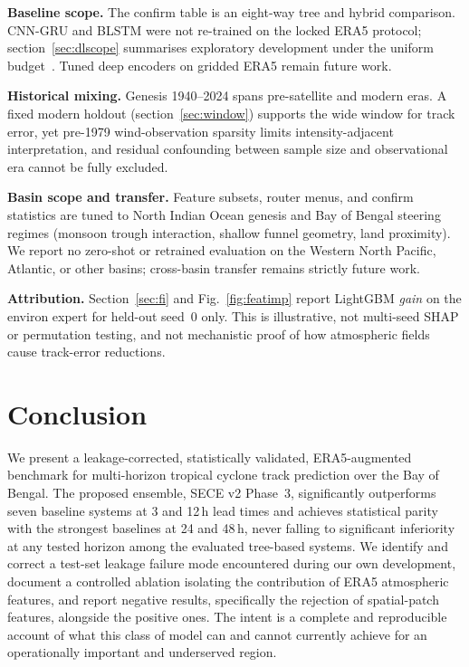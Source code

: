 \documentclass{ametsocv6.1}
\newcommand{\sece}{SECE}
\newcommand{\bob}{Bay of Bengal}
\newcommand{\era}{ERA5}
\begin{document}
\textbf{Baseline scope.} The confirm table is an eight-way tree and hybrid
comparison. CNN-GRU and BLSTM were not re-trained on the locked \era{} protocol;
section~\ref{sec:dlscope} summarises exploratory development under the uniform
budget~\citep{grinsztajn2022tree}. Tuned deep encoders on gridded \era{} remain
future work.

\textbf{Historical mixing.} Genesis 1940--2024 spans pre-satellite and modern
eras. A fixed modern holdout (section~\ref{sec:window}) supports the wide window
for track error, yet pre-1979 wind-observation sparsity limits
intensity-adjacent interpretation, and residual confounding between sample size
and observational era cannot be fully excluded.

\textbf{Basin scope and transfer.} Feature subsets, router menus, and confirm
statistics are tuned to North Indian Ocean genesis and \bob{} steering regimes
(monsoon trough interaction, shallow funnel geometry, land proximity). We report
no zero-shot or retrained evaluation on the Western North Pacific, Atlantic, or
other basins; cross-basin transfer remains strictly future work.

\textbf{Attribution.} Section~\ref{sec:fi} and Fig.~\ref{fig:featimp} report
LightGBM \emph{gain} on the environ expert for held-out seed~0 only. This is
illustrative, not multi-seed SHAP or permutation testing, and not mechanistic
proof of how atmospheric fields cause track-error reductions.

\section{Conclusion}
\label{sec:conclusion}
We present a leakage-corrected, statistically validated, \era{}-augmented
benchmark for multi-horizon tropical cyclone track prediction over the \bob{}. The
proposed ensemble, \sece{} v2 Phase~3, significantly outperforms seven baseline
systems at 3 and 12\,h lead times and achieves statistical parity with the
strongest baselines at 24 and 48\,h, never falling to significant inferiority at
any tested horizon among the evaluated tree-based systems. We identify and correct
a test-set leakage failure mode encountered during our own development, document a
controlled ablation isolating the contribution of \era{} atmospheric features, and
report negative results, specifically the rejection of spatial-patch features,
alongside the positive ones. The intent is a complete and reproducible account of
what this class of model can and cannot currently achieve for an operationally
important and underserved region.
\end{document}
